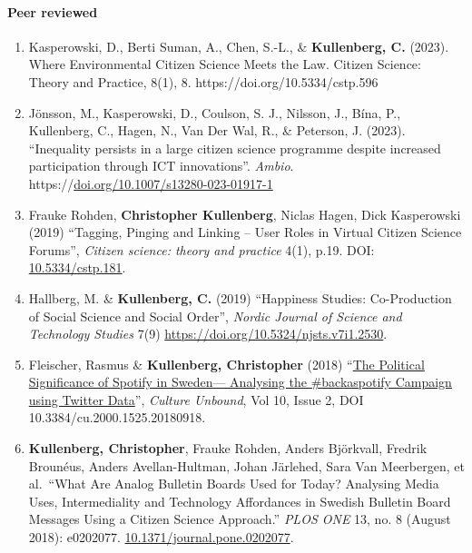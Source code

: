 \documentclass[
]{article}
\begin{document}
\hypertarget{peer-reviewed}{%
\paragraph{Peer reviewed}\label{peer-reviewed}}

\begin{enumerate}
\def\labelenumi{\arabic{enumi}.}
\item
  Kasperowski, D., Berti Suman, A., Chen, S.-L., \& \textbf{Kullenberg,
  C.} (2023). Where Environmental Citizen Science Meets the Law. Citizen
  Science: Theory and Practice, 8(1), 8.
  https://doi.org/10.5334/cstp.596
\item
  Jönsson, M., Kasperowski, D., Coulson, S. J., Nilsson, J., Bína, P.,
  Kullenberg, C., Hagen, N., Van Der Wal, R., \& Peterson, J. (2023).
  ``Inequality persists in a large citizen science programme despite
  increased participation through ICT innovations''. \emph{Ambio}.
  https://\href{https://doi.org/10.1007/s13280-023-01917-1}{doi.org/10.1007/s13280-023-01917-1}
\item
  Frauke Rohden, \textbf{Christopher Kullenberg}, Niclas Hagen, Dick
  Kasperowski (2019) ``Tagging, Pinging and Linking -- User Roles in
  Virtual Citizen Science Forums'', \emph{Citizen science: theory and
  practice} 4(1), p.19. DOI:
  \href{https://doi.org/10.5334/cstp.181}{10.5334/cstp.181}.
\item
  Hallberg, M. \& \textbf{Kullenberg, C.} (2019) ``Happiness Studies:
  Co-Production of Social Science and Social Order'', \emph{Nordic
  Journal of Science and Technology Studies} 7(9)
  \url{https://doi.org/10.5324/njsts.v7i1.2530}.
\item
  Fleischer, Rasmus \& \textbf{Kullenberg, Christopher} (2018)
  ``\href{http://www.cultureunbound.ep.liu.se/article.asp?DOI=10.3384/cu.2000.1525.20180918}{The
  Political Significance of Spotify in Sweden--- Analysing the
  \#backaspotify Campaign using Twitter Data}'', \emph{Culture Unbound},
  Vol 10, Issue 2, DOI 10.3384/cu.2000.1525.20180918.
\item
  \textbf{Kullenberg, Christopher}, Frauke Rohden, Anders Björkvall,
  Fredrik Brounéus, Anders Avellan-Hultman, Johan Järlehed, Sara Van
  Meerbergen, et al.~``What Are Analog Bulletin Boards Used for Today?
  Analysing Media Uses, Intermediality and Technology Affordances in
  Swedish Bulletin Board Messages Using a Citizen Science Approach.''
  \emph{PLOS ONE} 13, no. 8 (August 2018): e0202077.
  \href{https://doi.org/10.1371/journal.pone.0202077}{10.1371/journal.pone.0202077}.

\end{enumerate}
\end{document}
